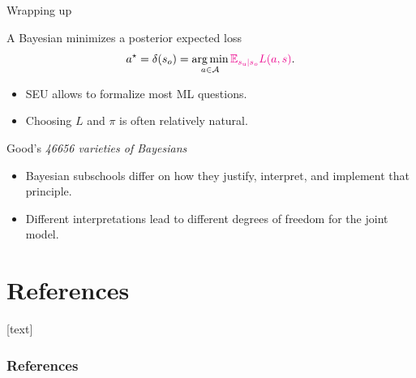 \documentclass[10pt]{beamer}
\begin{document}
\begin{frame}{Wrapping up}
  \begin{block}{A Bayesian minimizes a posterior expected loss}
  $$
    a^\star = \delta(s_o) = \operatorname*{arg\,min}_{a\in\mathcal{A}} \textcolor{magenta}{\mathbb{E}_{s_{\text{u}}\vert s_{o}} L(a,s)}.
  $$
  \end{block}
  \vfill
  \begin{itemize}
    \item SEU allows to formalize most ML questions.
    \item Choosing $L$ and $\pi$ is often relatively natural.
  \end{itemize}
  \vfill
  \begin{alertblock}{Good's {\it 46656 varieties of Bayesians}}
    \begin{itemize}
      \item Bayesian subschools differ on how they justify, interpret, and implement that principle.
      \item Different interpretations lead to different degrees of freedom for the joint model.
    \end{itemize}
  \end{alertblock}
  
\end{frame}

\nocite{MaRo07,PaIn09,Rob07}

\section*{References}
[text]%
\begin{frame}[allowframebreaks]
\frametitle{References}
\small
\printbibliography
\normalsize
\end{frame}
\end{document}
